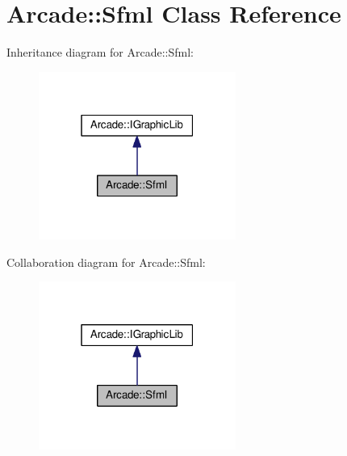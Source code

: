 \hypertarget{class_arcade_1_1_sfml}{}\section{Arcade\+:\+:Sfml Class Reference}
\label{class_arcade_1_1_sfml}


Inheritance diagram for Arcade\+:\+:Sfml\+:
\nopagebreak
\begin{figure}[H]
\begin{center}
\leavevmode
\includegraphics[width=183pt]{class_arcade_1_1_sfml__inherit__graph}
\end{center}
\end{figure}


Collaboration diagram for Arcade\+:\+:Sfml\+:
\nopagebreak
\begin{figure}[H]
\begin{center}
\leavevmode
\includegraphics[width=183pt]{class_arcade_1_1_sfml__coll__graph}
\end{center}
\end{figure}
